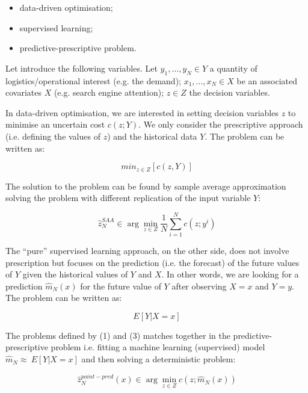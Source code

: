\begin{itemize}
    \item data-driven optimisation;
    \item supervised learning;
    \item predictive-prescriptive problem.

\end{itemize}

Let introduce the following variables. Let $y_1,\ldots,y_N\in Y$ a quantity of logistics/operational interest (e.g. the demand); $x_1,\ldots,x_N\in X$ be an associated covariates $X$ (e.g. search engine attention); $z\in Z$ the decision variables.

In data-driven optimisation, we are interested in setting decision variables $z$ to minimise an uncertain cost $c(z;Y)$. We only consider the prescriptive approach (i.e. defining the values of $z$) and the historical data $Y$. The problem can be written as:

\begin{equation}
    min_{z \in Z} \left[ c(z,Y) \right]
\end{equation}

The solution to the problem can be found by sample average approximation solving the problem with different replication of the input variable $Y$:

\begin{equation}
    {\hat{z}}_N^{SAA}\in\arg{\min_{z\in Z}{\frac{1}{N}\sum_{i=1}^{N}{c(z;y^i)}}}
\end{equation}

The “pure” supervised learning approach, on the other side, does not involve prescription but focuses on the prediction (i.e. the forecast) of the future values of $Y$ given the historical values of $Y$ and $X$. In other words, we are looking for a prediction ${\hat{m}}_N(x)$ for the future value of $Y$ after observing $X=x$ and $Y=y$. The problem can be written as:

\begin{equation}
    E \left[ Y|X=x \right]
\end{equation}

The problems defined by (1) and (3) matches together in the predictive-prescriptive problem i.e. fitting a machine learning (supervised) model ${\hat{m}}_N\approx\ E[Y|X=x]$ and then solving a deterministic problem:

\begin{equation}
    {\hat{z}}_N^{point-pred}\left(x\right)\in\arg{\min_{z\in Z}{c(z;{\hat{m}}_N(x))}}
\end{equation}

